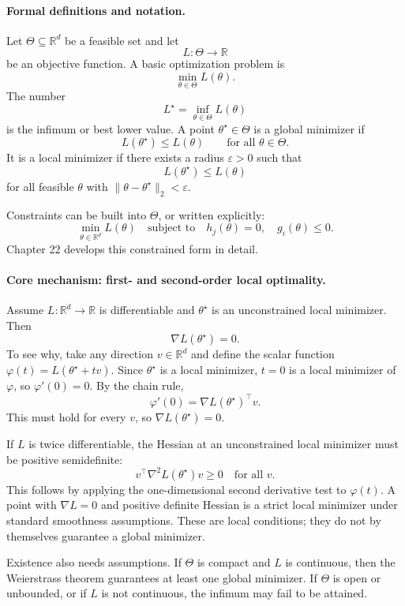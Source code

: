 \paragraph{Formal definitions and notation.}
Let \(\Theta\subseteq\mathbb R^d\) be a feasible set and let
\[
L:\Theta\to\mathbb R
\]
be an objective function. A basic optimization problem is
\[
\boxed{
\min_{\theta\in\Theta} L(\theta).
}
\]
The number
\[
L^\star=\inf_{\theta\in\Theta}L(\theta)
\]
is the infimum or best lower value. A point \(\theta^\star\in\Theta\) is a global minimizer if
\[
L(\theta^\star)\le L(\theta)\qquad \text{for all }\theta\in\Theta.
\]
It is a local minimizer if there exists a radius \(\varepsilon>0\) such that
\[
L(\theta^\star)\le L(\theta)
\]
for all feasible \(\theta\) with \(\|\theta-\theta^\star\|_2<\varepsilon\).

Constraints can be built into \(\Theta\), or written explicitly:
\[
\min_{\theta\in\mathbb R^d}L(\theta)
\quad\text{subject to}\quad
h_j(\theta)=0,\quad g_i(\theta)\le 0.
\]
Chapter 22 develops this constrained form in detail.

\paragraph{Core mechanism: first- and second-order local optimality.}
Assume \(L:\mathbb R^d\to\mathbb R\) is differentiable and \(\theta^\star\) is an unconstrained local minimizer. Then
\[
\boxed{\nabla L(\theta^\star)=0.}
\]
To see why, take any direction \(v\in\mathbb R^d\) and define the scalar function \(\varphi(t)=L(\theta^\star+tv)\). Since \(\theta^\star\) is a local minimizer, \(t=0\) is a local minimizer of \(\varphi\), so \(\varphi'(0)=0\). By the chain rule,
\[
\varphi'(0)=\nabla L(\theta^\star)^\top v.
\]
This must hold for every \(v\), so \(\nabla L(\theta^\star)=0\).

If \(L\) is twice differentiable, the Hessian at an unconstrained local minimizer must be positive semidefinite:
\[
\boxed{v^\top \nabla^2L(\theta^\star)v\ge 0\quad\text{for all }v.}
\]
This follows by applying the one-dimensional second derivative test to \(\varphi(t)\). A point with \(\nabla L=0\) and positive definite Hessian is a strict local minimizer under standard smoothness assumptions. These are local conditions; they do not by themselves guarantee a global minimizer.

Existence also needs assumptions. If \(\Theta\) is compact and \(L\) is continuous, then the Weierstrass theorem guarantees at least one global minimizer. If \(\Theta\) is open or unbounded, or if \(L\) is not continuous, the infimum may fail to be attained.


